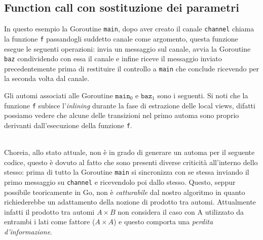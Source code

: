 \subsection{Function call con sostituzione dei parametri}
In questo esempio la Goroutine \texttt{main}, dopo aver creato il canale \texttt{channel} chiama la funzione \texttt{f} passandogli suddetto canale come argomento, questa funzione esegue le seguenti operazioni: invia un messaggio sul canale, avvia la Goroutine \texttt{baz} condividendo con essa il canale e infine riceve il messaggio inviato precedentemente prima di restituire il controllo a \texttt{main} che conclude ricevendo per la seconda volta dal canale.
\newpage %

Gli automi associati alle Goroutine $\texttt{main}_0$ e $\texttt{baz}_1$ sono i seguenti. Si noti che la funzione \texttt{f} subisce l'\emph{inlining} durante la fase di estrazione delle local views, difatti possiamo vedere che alcune delle transizioni nel primo automa sono proprio derivanti dall'esecuzione della funzione \texttt{f}.
\begin{figure}[h!]
\end{figure}\\
Choreia, allo stato attuale, non è in grado di generare un automa per il seguente codice, questo è dovuto al fatto che sono presenti diverse criticità all'interno dello stesso: prima di tutto la Goroutine \texttt{main} si sincronizza con se stessa inviando il primo messaggio su \texttt{channel} e ricevendolo poi dallo stesso. Questo, seppur possibile teoricamente in Go, non è \emph{catturabile} dal nostro algoritmo in quanto richiederebbe un adattamento della nozione di prodotto tra automi. Attualmente infatti il prodotto tra automi $A \times B$ non considera il caso con A utilizzato da entrambi i lati come fattore ($A \times A$) e questo comporta una \emph{perdita d'informazione}.\\
